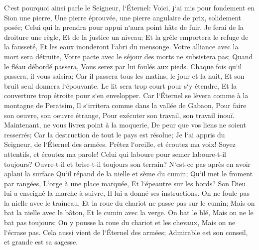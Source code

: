 \verse C`est pourquoi ainsi parle le Seigneur, l`Éternel: Voici, j`ai mis pour fondement en Sion une pierre, Une pierre éprouvée, une pierre angulaire de prix, solidement posée; Celui qui la prendra pour appui n`aura point hâte de fuir. 
\verse Je ferai de la droiture une règle, Et de la justice un niveau; Et la grêle emportera le refuge de la fausseté, Et les eaux inonderont l`abri du mensonge. 
\verse Votre alliance avec la mort sera détruite, Votre pacte avec le séjour des morts ne subsistera pas; Quand le fléau débordé passera, Vous serez par lui foulés aux pieds. 
\verse Chaque fois qu`il passera, il vous saisira; Car il passera tous les matins, le jour et la nuit, Et son bruit seul donnera l`épouvante. 
\verse Le lit sera trop court pour s`y étendre, Et la couverture trop étroite pour s`en envelopper. 
\verse Car l`Éternel se lèvera comme à la montagne de Peratsim, Il s`irritera comme dans la vallée de Gabaon, Pour faire son oeuvre, son oeuvre étrange, Pour exécuter son travail, son travail inouï. 
\verse Maintenant, ne vous livrez point à la moquerie, De peur que vos liens ne soient resserrés; Car la destruction de tout le pays est résolue; Je l`ai appris du Seigneur, de l`Éternel des armées. 
\verse Prêtez l`oreille, et écoutez ma voix! Soyez attentifs, et écoutez ma parole! 
\verse Celui qui laboure pour semer laboure-t-il toujours? Ouvre-t-il et brise-t-il toujours son terrain? 
\verse N`est-ce pas après en avoir aplani la surface Qu`il répand de la nielle et sème du cumin; Qu`il met le froment par rangées, L`orge à une place marquée, Et l`épeautre sur les bords? 
\verse Son Dieu lui a enseigné la marche à suivre, Il lui a donné ses instructions. 
\verse On ne foule pas la nielle avec le traîneau, Et la roue du chariot ne passe pas sur le cumin; Mais on bat la nielle avec le bâton, Et le cumin avec la verge. 
\verse On bat le blé, Mais on ne le bat pas toujours; On y pousse la roue du chariot et les chevaux, Mais on ne l`écrase pas. 
\verse Cela aussi vient de l`Éternel des armées; Admirable est son conseil, et grande est sa sagesse. 

